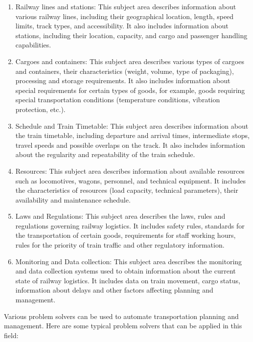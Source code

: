 \documentclass[a4paper]{article}
\begin{document}
\setlength\parindent{11pt}
\fontsize{10}{11}\selectfont


\begin{multicols}{2}
 \renewcommand{\labelenumi}{\theenumi)} %
 \begin{enumerate} [itemsep=-5pt, labelsep=5pt] %
     \item Railway lines and stations: This subject area describes information about various railway lines,
including their geographical location, length, speed
limits, track types, and accessibility. It also includes information about stations, including their
location, capacity, and cargo and passenger handling capabilities.
\item Cargoes and containers: This subject area describes
various types of cargoes and containers, their characteristics (weight, volume, type of packaging), processing and storage requirements. It also includes information about special requirements for
certain types of goods, for example, goods requiring special transportation conditions (temperature
conditions, vibration protection, etc.).
\item Schedule and Train Timetable: This subject area
describes information about the train timetable,
including departure and arrival times, intermediate stops, travel speeds and possible overlaps on
the track. It also includes information about the
regularity and repeatability of the train schedule.
\item Resources: This subject area describes information about available resources such as locomotives, wagons, personnel, and technical equipment.
It includes the characteristics of resources (load
capacity, technical parameters), their availability
and maintenance schedule. 
\item Laws and Regulations: This subject area describes
the laws, rules and regulations governing railway
logistics. It includes safety rules, standards for the
transportation of certain goods, requirements for
staff working hours, rules for the priority of train
traffic and other regulatory information.
\item {Monitoring and Data collection: This subject area
describes the monitoring and data collection systems used to obtain information about the current
state of railway logistics. It includes data on train
movement, cargo status, information about delays
and other factors affecting planning and management.}
 \end{enumerate}
{\vspace{-0.2cm} \hspace{0.3cm}} Various problem solvers can be used to automate transportation planning and management. Here are some
typical problem solvers that can be applied in this field:


\end{multicols}
\end{document}
